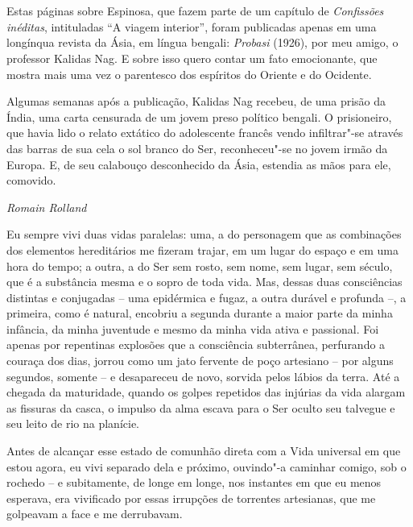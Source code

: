 \chapter*{}
\thispagestyle{empty}

Estas páginas sobre Espinosa, que fazem parte de um capítulo de
\emph{Confissões inéditas}, intituladas ``A viagem interior'', foram
publicadas apenas em uma longínqua revista da Ásia, em língua bengali:
\emph{Probasi} (1926), por meu amigo, o professor Kalidas Nag. E sobre
isso quero contar um fato emocionante, que mostra mais uma vez o
parentesco dos espíritos do Oriente e do Ocidente.

Algumas semanas após a publicação, Kalidas Nag recebeu, de uma prisão da
Índia, uma carta censurada de um jovem preso político bengali. O
prisioneiro, que havia lido o relato extático do adolescente francês
vendo infiltrar"-se através das barras de sua cela o sol branco do Ser,
reconheceu"-se no jovem irmão da Europa. E, de seu calabouço desconhecido
da Ásia, estendia as mãos para ele, comovido.

\begin{flushright}
\emph{Romain Rolland}
\end{flushright}

\pagebreak
\thispagestyle{empty}
\movetooddpage

Eu sempre vivi duas vidas paralelas: uma, a do personagem que as
combinações dos elementos hereditários me fizeram trajar, em um lugar do
espaço e em uma hora do tempo; a outra, a do Ser sem rosto, sem nome,
sem lugar, sem século, que é a substância mesma e o sopro de toda vida.
Mas, dessas duas consciências distintas e conjugadas -- uma epidérmica e
fugaz, a outra durável e profunda --, a primeira, como é natural,
encobriu a segunda durante a maior parte da minha infância, da minha
juventude e mesmo da minha vida ativa e passional. Foi apenas por
repentinas explosões que a consciência subterrânea, perfurando a couraça
dos dias, jorrou como um jato fervente de poço artesiano -- por alguns
segundos, somente -- e desapareceu de novo, sorvida pelos lábios da
terra. Até a chegada da maturidade, quando os golpes repetidos das
injúrias da vida alargam as fissuras da casca, o impulso da alma escava
para o Ser oculto seu talvegue e seu leito de rio na planície.

Antes de alcançar esse estado de comunhão direta com a Vida universal em
que estou agora, eu vivi separado dela e próximo, ouvindo"-a caminhar
comigo, sob o rochedo -- e subitamente, de longe em longe, nos instantes
em que eu menos esperava, era vivificado por essas irrupções de
torrentes artesianas, que me golpeavam a face e me derrubavam.

